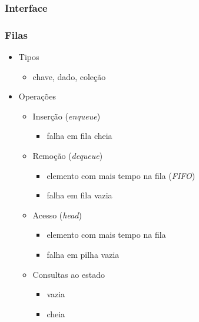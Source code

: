\documentclass{beamer}
\begin{document}
\begin{frame}
  \frametitle{Interface}
  \frametitle{Filas}

  \begin{itemize}
    \item Tipos
      \begin{itemize}
        \item chave, dado, coleção
      \end{itemize}
    \item Operações
      \begin{itemize}
        \item Inserção (\textit{enqueue\/})
          \begin{itemize}
            \item falha em fila cheia
          \end{itemize}
        \item Remoção (\textit{dequeue\/})
          \begin{itemize}
            \item elemento com mais tempo na fila (\textit{FIFO\/})
            \item falha em fila vazia
          \end{itemize}
        \item Acesso  (\textit{head\/})
          \begin{itemize}
            \item elemento com mais tempo na fila
            \item falha em pilha vazia
          \end{itemize}
        \item Consultas ao estado
          \begin{itemize}
          \item vazia
          \item cheia
          \end{itemize}
      \end{itemize}
  \end{itemize}
\end{frame}
\end{document}
